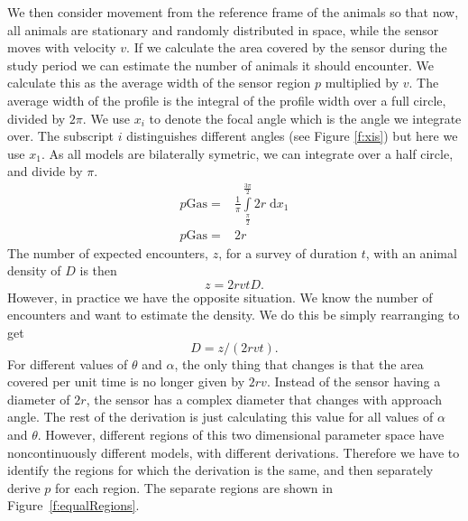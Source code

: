 We then consider movement from the reference frame of the animals so that now, all animals are stationary and randomly distributed in space, while the sensor moves with velocity $v$. If we calculate the area covered by the sensor during the study period we can estimate the number of animals it should encounter. We calculate this as the average width of the sensor region $p$ multiplied by $v$. The average width of the profile is the integral of the profile width over a full circle, divided by $2\pi$. We use $x_i$ to denote the focal angle which is the angle we integrate over. The subscript $i$ distinguishes different angles (see Figure \ref{f:xis}) but here we use $x_1$.  As all models are bilaterally symetric, we can integrate over a half circle, and divide by $\pi$.
\begin{align}
p\text{Gas} =& \frac{1}{\pi}\int\limits_{\frac{\pi}{2}}^{\frac{3\pi}{2}} 2r \; \mathrm{d}x_1\\
p\text{Gas} =& 2r
\end{align}
The number of expected encounters, $z$, for a survey of duration $t$, with an animal density of $D$ is then
\begin{equation}
	z = 2rvtD.
\end{equation}
However, in practice we have the opposite situation. We know the number of encounters and want to estimate the density. We do this be simply rearranging to get
\begin{equation}
	D = z/(2rvt).
\end{equation}
For different values of $\theta$ and $\alpha$, the only thing that changes is that the area covered per unit time is no longer given by $2rv$. Instead of the sensor having a diameter of $2r$, the sensor has a complex diameter that changes with approach angle. The rest of the derivation is just calculating this value for all values of $\alpha$ and $\theta$. However, different regions of this two dimensional parameter space have noncontinuously different models, with different derivations. Therefore we have to identify the regions for which the derivation is the same, and then separately derive $p$ for each region. The separate regions are shown in Figure~\ref{f:equalRegions}.

